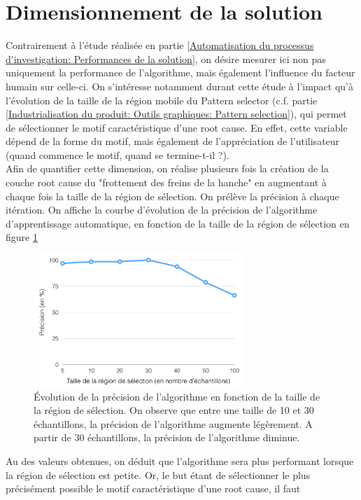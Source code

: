 \section{Dimensionnement de la solution}
\label{Industrialisation du produit: Dimensionnement de la solution}
Contrairement à l'étude réalisée en partie \ref{Automatisation du processus d'investigation: Performances de la solution}, on désire mesurer ici non pas uniquement la performance de l'algorithme, mais également l'influence du facteur humain sur celle-ci. On s'intéresse notamment durant cette étude à l'impact qu'à l'évolution de la taille de la région mobile du Pattern selector (c.f. partie \ref{Industrialisation du produit: Outils graphiques: Pattern selection}), qui permet de sélectionner le motif caractéristique d'une root cause. En effet, cette variable dépend de la forme du motif, mais également de l'appréciation de l'utilisateur (quand commence le motif, quand se termine-t-il ?). \\
Afin de quantifier cette dimension, on réalise plusieurs fois la création de la couche root cause du "frottement des freins de la hanche" en augmentant à chaque fois la taille de la région de sélection. On prélève la précision à chaque itération. On affiche la courbe d'évolution de la précision de l'algorithme d'apprentissage automatique, en fonction de la taille de la région de sélection en figure \ref{fig: Evolution de la précision de l'algorithme en fonction de la taille de la région de sélection}

\begin{figure}[H]
	\centering\includegraphics[height=5cm]{images/precision_taille.png}
	\caption[Evolution de la précision de l'algorithme en fonction de la taille de la région de sélection]{Évolution de la précision de l'algorithme en fonction de la taille de la région de sélection.  On observe que entre une taille de 10 et 30 échantillons, la précision de l'algorithme augmente légèrement. A partir de 30 échantillons, la précision de l'algorithme diminue.}
	\label{fig: Evolution de la précision de l'algorithme en fonction de la taille de la région de sélection}
\end{figure} 

Au des valeurs obtenues, on déduit que l'algorithme sera plus performant lorsque la région de sélection est petite. Or, le but étant de sélectionner le plus précisément possible le motif caractéristique d'une root cause, il faut 